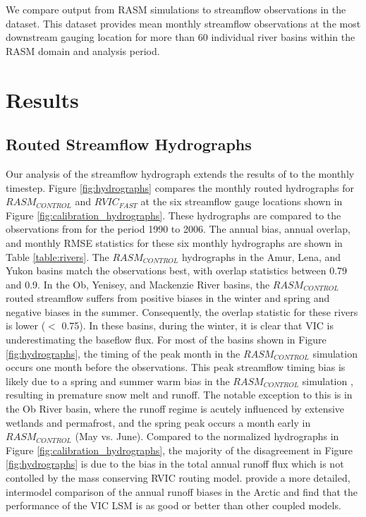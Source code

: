 \documentclass[jgrga, draft]{agutex}
\begin{document}
\begin{article}
We compare output from RASM simulations to streamflow observations in the \citet{Dai_2009} dataset.
This dataset provides mean monthly streamflow observations at the most downstream gauging location for more than 60 individual river basins within the RASM domain and analysis period.

\section{Results}
\label{sec:results}

\subsection{Routed Streamflow Hydrographs}
\label{sec:hydrographs}

Our analysis of the streamflow hydrograph extends the results of \citet{Hamman_2016} to the monthly timestep.
Figure \ref{fig:hydrographs} compares the monthly routed hydrographs for $RASM_{CONTROL}$ and $RVIC_{FAST}$ at the six streamflow gauge locations shown in Figure \ref{fig:calibration_hydrographs}.
These hydrographs are compared to the observations from \citet{Dai_2009} for the period 1990 to 2006.
The annual bias, annual overlap, and monthly RMSE statistics for these six monthly hydrographs are shown in Table \ref{table:rivers}.
The $RASM_{CONTROL}$ hydrographs in the Amur, Lena, and Yukon basins match the observations best, with overlap statistics between 0.79 and 0.9.
In the Ob, Yenisey, and Mackenzie River basins, the $RASM_{CONTROL}$ routed streamflow suffers from positive biases in the winter and spring and negative biases in the summer.
Consequently, the overlap statistic for these rivers is lower ($<$ 0.75).
In these basins, during the winter, it is clear that VIC is underestimating the baseflow flux.
For most of the basins shown in Figure \ref{fig:hydrographs}, the timing of the peak month in the $RASM_{CONTROL}$ simulation occurs one month before the observations.
This peak streamflow timing bias is likely due to a spring and summer warm bias in the $RASM_{CONTROL}$ simulation \citep{Hamman_2016,Cassano_2016}, resulting in premature snow melt and runoff.
The notable exception to this is in the Ob River basin, where the runoff regime is acutely influenced by extensive wetlands and permafrost, and the spring peak occurs a month early in $RASM_{CONTROL}$ (May vs. June).
Compared to the normalized hydrographs in Figure \ref{fig:calibration_hydrographs}, the majority of the disagreement in Figure \ref{fig:hydrographs} is due to the bias in the total annual runoff flux which is not contolled by the mass conserving RVIC routing model.
\citet{Hamman_2016} provide a more detailed, intermodel comparison of the annual runoff biases in the Arctic and find that the performance of the VIC LSM is as good or better than other coupled models.


\end{article}
\end{document}
